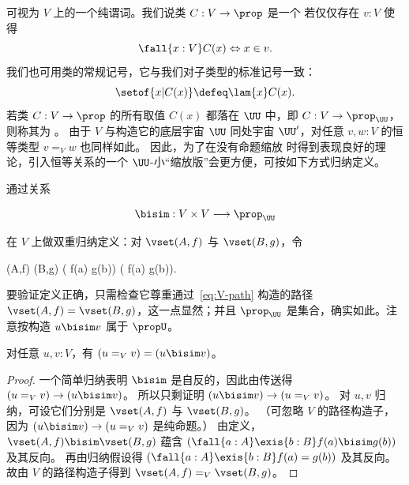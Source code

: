 %
可视为 $V$ 上的一个纯谓词。我们说类 $C : V \to \prop$ 是一个
%
若仅仅存在 $v:V$ 使得
%
\begin{equation*}
  \fall{x : V} C(x) \Leftrightarrow x \in v.
\end{equation*}
我们也可用类的常规记号，它与我们对子类型的标准记号一致：
\begin{equation}
  \setof{ x | C(x) } \defeq \lam{x}C(x).\label{eq:class-notation}
\end{equation}
%
若类 $C: V\to \prop$ 的所有取值 $C(x)$ 都落在 $\UU$ 中，即 $C: V\to \prop_{\UU}$，
则称其为
%
%
。
由于 $V$ 与构造它的底层宇宙 $\UU$ 同处宇宙 $\UU'$，对任意 $v,w:V$ 的恒等类型 $v=_V w$ 也同样如此。
因此，为了在没有命题缩放
%
%
时得到表现良好的理论，引入恒等关系的一个 $\UU$-小“缩放版”会更方便，可按如下方式归纳定义。

\begin{defn}\label{def:bisimulation}
  通过关系
  
  \begin{equation*}
    \mathord\bisim : V \times V \longrightarrow \prop_{\UU}
  \end{equation*}
  
  在 $V$ 上做双重归纳定义：对 $\vset(A,f)$ 与 $\vset(B,g)$，令
  \begin{narrowmultline*}
    \vset(A,f)  \bisim \vset(B,g)  \narrowbreak
    \big( f(a)  \bisim g(b)\big) \land
    \big( f(a) \bisim g(b)\big).
  \end{narrowmultline*}
\end{defn}
%
要验证定义正确，只需检查它尊重通过~\eqref{eq:V-path} 构造的路径 $\vset(A, f) = \vset(B, g)$，这一点显然；并且 $\prop_{\UU}$ 是集合，确实如此。注意按构造 $u \bisim v$ 属于 $\propU$。

\begin{lem}\label{lem:BisimEqualsId}
对任意 $u,v:V$，有 $(u=_V v) = (u \bisim v)$。
\end{lem}

\begin{proof}
一个简单归纳表明 $\bisim$ 是自反的，因此由传送得 $(u=_V v)\to (u \bisim v)$。
所以只剩证明 $(u \bisim v)\to (u=_V v)$。
对 $u,v$ 归纳，可设它们分别是 $\vset(A,f)$ 与 $\vset(B,g)$。
（可忽略 $V$ 的路径构造子，因为 $(u \bisim v)\to (u=_V v)$ 是纯命题。）
由定义，$\vset(A,f)\bisim\vset(B,g)$ 蕴含 $(\fall{a:A}\exis{b:B}f(a)  \bisim g(b))$ 及其反向。
再由归纳假设得 $(\fall{a:A}\exis{b:B}f(a) = g(b))$ 及其反向。
故由 $V$ 的路径构造子得到 $\vset(A,f) =_V \vset(B,g)$。
\end{proof}

